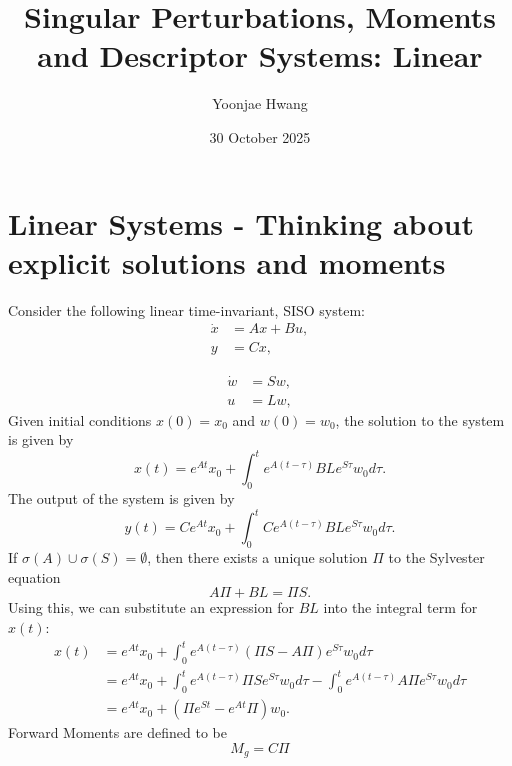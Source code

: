\documentclass{article}
\title{Singular Perturbations, Moments and Descriptor Systems: Linear}
\author{Yoonjae Hwang}
\date{30 October 2025}
\begin{document}
\maketitle

\section{Linear Systems - Thinking about explicit solutions and moments}
Consider the following linear time-invariant, SISO system:
\label{sec:linear-systems}
\begin{equation}
\begin{aligned}
\dot{x} &= A x + B u, \\
y & = Cx,
\end{aligned}
\end{equation}

\begin{equation}
\begin{aligned}
\dot{w} &= Sw, \\
u &= Lw,
\end{aligned}
\end{equation}
Given initial conditions \(x(0) = x_0\) and \(w(0) = w_0\), the solution to the system is given by
\begin{equation}
x(t) = e^{At} x_0 + \int_0^t e^{A(t-\tau)} B L e^{S\tau} w_0 d\tau.
\end{equation}
The output of the system is given by
\begin{equation}
y(t) = C e^{At} x_0 + \int_0^t C e^{A(t-\tau)} B L e^{S\tau} w_0 d\tau.
\end{equation}
If $\sigma(A) \cup \sigma(S) = \emptyset$, then there exists a unique solution $\Pi$ to the Sylvester equation
\begin{equation}
A \Pi + B L = \Pi S.
\end{equation}
Using this, we can substitute an expression for \(B L\) into the integral term for $x(t)$:
\begin{equation}
\begin{aligned}
x(t) &= e^{At} x_0 + \int_0^t e^{A(t-\tau)} (\Pi S - A \Pi) e^{S\tau} w_0 d\tau \\
&= e^{At} x_0 + \int_0^t e^{A(t-\tau)} \Pi S e^{S\tau} w_0 d\tau - \int_0^t e^{A(t-\tau)} A \Pi e^{S\tau} w_0 d\tau \\
&= e^{At} x_0 + \left( \Pi e^{St} - e^{At} \Pi \right) w_0 .
\end{aligned}
\end{equation}
Forward Moments are defined to be 
\begin{equation}
M_g = C \Pi
\end{equation}
\end{document}
